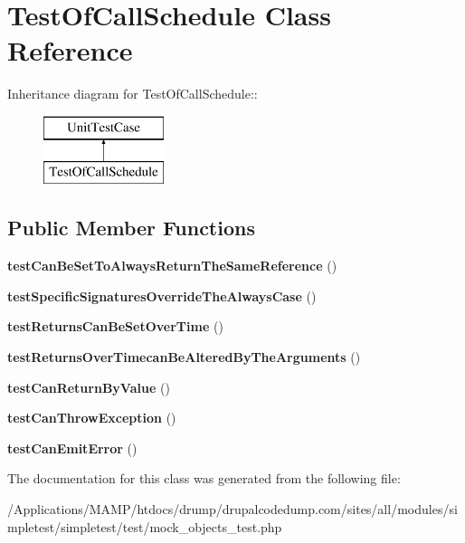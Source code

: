 \hypertarget{class_test_of_call_schedule}{
\section{TestOfCallSchedule Class Reference}
\label{class_test_of_call_schedule}
}
Inheritance diagram for TestOfCallSchedule::\begin{figure}[H]
\begin{center}
\leavevmode
\includegraphics[height=2cm]{class_test_of_call_schedule}
\end{center}
\end{figure}
\subsection*{Public Member Functions}
\begin{DoxyCompactItemize}
\item 
\hypertarget{class_test_of_call_schedule_a1ec8790513d58e2a98e867e8f557b8c2}{
{\bfseries testCanBeSetToAlwaysReturnTheSameReference} ()}
\label{class_test_of_call_schedule_a1ec8790513d58e2a98e867e8f557b8c2}

\item 
\hypertarget{class_test_of_call_schedule_a8104adabc4adbc6332883766ec03dff7}{
{\bfseries testSpecificSignaturesOverrideTheAlwaysCase} ()}
\label{class_test_of_call_schedule_a8104adabc4adbc6332883766ec03dff7}

\item 
\hypertarget{class_test_of_call_schedule_a8bfc1b0a2aea7aa00af10624bd7539f2}{
{\bfseries testReturnsCanBeSetOverTime} ()}
\label{class_test_of_call_schedule_a8bfc1b0a2aea7aa00af10624bd7539f2}

\item 
\hypertarget{class_test_of_call_schedule_a4aa49075b188781151d1d27e38668783}{
{\bfseries testReturnsOverTimecanBeAlteredByTheArguments} ()}
\label{class_test_of_call_schedule_a4aa49075b188781151d1d27e38668783}

\item 
\hypertarget{class_test_of_call_schedule_acdaead3996379672b067be444cebf9b8}{
{\bfseries testCanReturnByValue} ()}
\label{class_test_of_call_schedule_acdaead3996379672b067be444cebf9b8}

\item 
\hypertarget{class_test_of_call_schedule_a6da98c23d6a0dcdfe68eb8c15548c219}{
{\bfseries testCanThrowException} ()}
\label{class_test_of_call_schedule_a6da98c23d6a0dcdfe68eb8c15548c219}

\item 
\hypertarget{class_test_of_call_schedule_af608a235acdee4f0103bf35a3b1aed66}{
{\bfseries testCanEmitError} ()}
\label{class_test_of_call_schedule_af608a235acdee4f0103bf35a3b1aed66}

\end{DoxyCompactItemize}


The documentation for this class was generated from the following file:\begin{DoxyCompactItemize}
\item 
/Applications/MAMP/htdocs/drump/drupalcodedump.com/sites/all/modules/simpletest/simpletest/test/mock\_\-objects\_\-test.php\end{DoxyCompactItemize}
